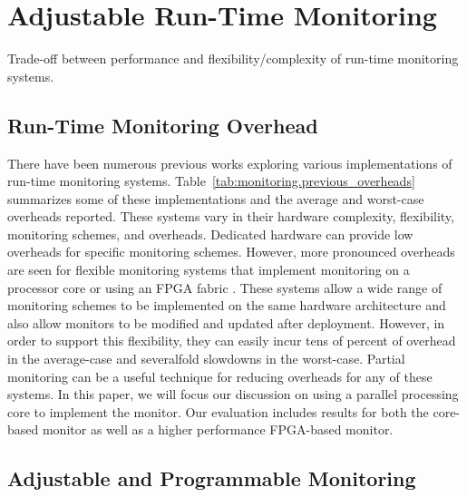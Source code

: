 \section{Adjustable Run-Time Monitoring}
\label{sec:monitoring}

\begin{table*}[t]
  \begin{center}
    \vspace{-0.0in}
    \begin{footnotesize}
    
    \end{footnotesize}
    \caption{Trade-off between performance and flexibility/complexity of run-time monitoring systems.}
    \vspace{-0.2in}
    \label{tab:monitoring.previous_overheads}
  \end{center}
\end{table*}

\subsection{Run-Time Monitoring Overhead}

There have been numerous previous works exploring various implementations of
run-time monitoring systems. Table~\ref{tab:monitoring.previous_overheads}
summarizes some of these implementations and the average and worst-case
overheads reported. These systems vary in their hardware complexity,
flexibility, monitoring schemes, and overheads. Dedicated hardware can provide low 
overheads for specific monitoring schemes. However, more pronounced overheads are seen for 
flexible monitoring systems that implement monitoring on a processor core
\cite{lba-asid06, lba-isca08, nagarajan-interact08} or using an FPGA fabric
\cite{flexcore-micro10}. These systems allow a wide range of monitoring schemes to
be implemented on the same hardware architecture and also allow monitors to be modified and updated after deployment. However, in order to support this flexibility, they can easily incur tens of percent of
overhead in the average-case and severalfold slowdowns in the worst-case. Partial monitoring
can be a useful technique for reducing overheads for any of these systems.
In this paper, we will focus our discussion on using a parallel
processing core to implement the monitor. Our evaluation includes results
for both the core-based monitor as well as a higher performance FPGA-based monitor.

\subsection{Adjustable and Programmable Monitoring}

